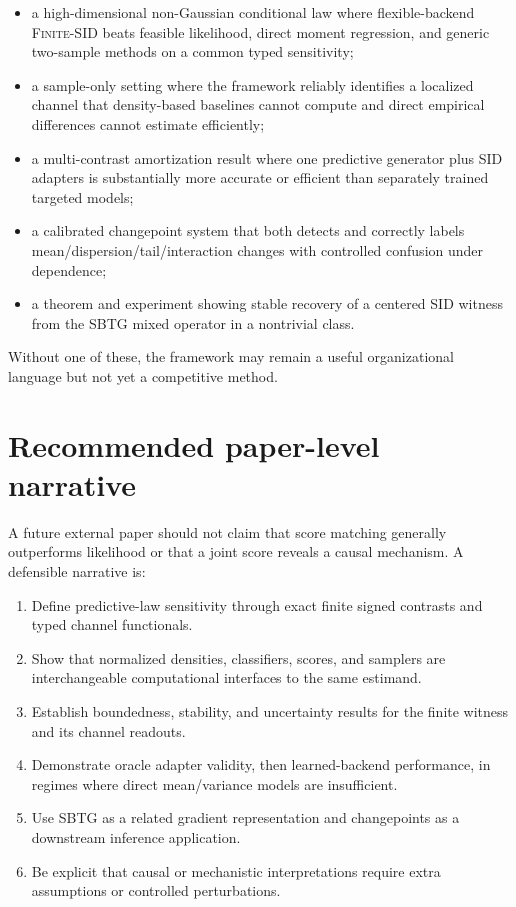 \documentclass[10pt]{article}
\newcommand{\FiniteSID}{\textnormal{\textsc{Finite-SID}}\xspace}
\begin{document}
\begin{itemize}
  \item a high-dimensional non-Gaussian conditional law where flexible-backend \FiniteSID beats feasible likelihood, direct moment regression, and generic two-sample methods on a common typed sensitivity;
  \item a sample-only setting where the framework reliably identifies a localized channel that density-based baselines cannot compute and direct empirical differences cannot estimate efficiently;
  \item a multi-contrast amortization result where one predictive generator plus SID adapters is substantially more accurate or efficient than separately trained targeted models;
  \item a calibrated changepoint system that both detects and correctly labels mean/dispersion/tail/interaction changes with controlled confusion under dependence;
  \item a theorem and experiment showing stable recovery of a centered SID witness from the SBTG mixed operator in a nontrivial class.
\end{itemize}

Without one of these, the framework may remain a useful organizational language but not yet a competitive method.

\section{Recommended paper-level narrative}

A future external paper should not claim that score matching generally outperforms likelihood or that a joint score reveals a causal mechanism. A defensible narrative is:

\begin{enumerate}
  \item Define predictive-law sensitivity through exact finite signed contrasts and typed channel functionals.
  \item Show that normalized densities, classifiers, scores, and samplers are interchangeable computational interfaces to the same estimand.
  \item Establish boundedness, stability, and uncertainty results for the finite witness and its channel readouts.
  \item Demonstrate oracle adapter validity, then learned-backend performance, in regimes where direct mean/variance models are insufficient.
  \item Use SBTG as a related gradient representation and changepoints as a downstream inference application.
  \item Be explicit that causal or mechanistic interpretations require extra assumptions or controlled perturbations.
\end{enumerate}
\end{document}
